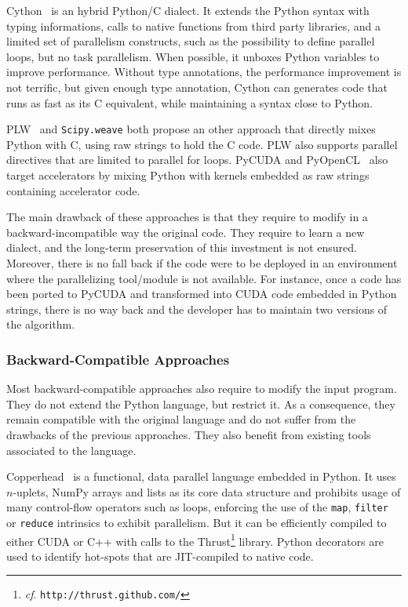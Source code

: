 \documentclass[conference]{IEEEtran}
\begin{document}
Cython~\cite{cython2010} is an hybrid Python/C dialect. It extends the Python
syntax with typing informations, calls to native functions from third party
libraries, and a limited set of parallelism constructs, such as the possibility
to define parallel loops, but no task parallelism. When possible, it unboxes
Python variables to improve performance. Without type annotations, the
performance improvement is not terrific, but given enough type annotation,
Cython can generates code that runs as fast as its C equivalent, while
maintaining a syntax close to Python.

PLW~\cite{dongara2007} and \texttt{Scipy.weave} both propose an other approach
that directly mixes Python with C, using raw strings to hold the C code. PLW
also supports parallel directives that are limited to parallel for loops.
PyCUDA and PyOpenCL~\cite{klockner2012} also target accelerators by mixing
Python with kernels embedded as raw strings containing accelerator code.

The main drawback of these approaches is that they require to modify in a
backward-incompatible way the original code. They require to learn a new
dialect, and the long-term preservation of this investment is not ensured.
Moreover, there is no fall back if the code were to be deployed in an
environment where the parallelizing tool/module is not available. For instance,
once a code has been ported to PyCUDA and transformed into CUDA code embedded in
Python strings, there is no way back and the developer has to maintain two
versions of the algorithm.

\subsubsection{Backward-Compatible Approaches}

Most backward-compatible approaches also require to modify the input program.
They do not extend the Python language, but restrict it. As a consequence, they
remain compatible with the original language and do not suffer from the
drawbacks of the previous approaches. They also benefit from existing tools
associated to the language.

Copperhead~\cite{copperhead2011} is a functional, data parallel language
embedded in Python. It uses $n$-uplets, NumPy arrays and lists as its core data
structure and prohibits usage of many control-flow operators such as loops,
enforcing the use of the \texttt{map}, \texttt{filter} or \texttt{reduce}
intrinsics to exhibit parallelism. But it can be efficiently compiled to either
CUDA or C++ with calls to the Thrust\footnote{\emph{cf}.
\texttt{http://thrust.github.com/}} library. Python decorators are used to
identify hot-spots that are JIT-compiled to native code.
\end{document}
